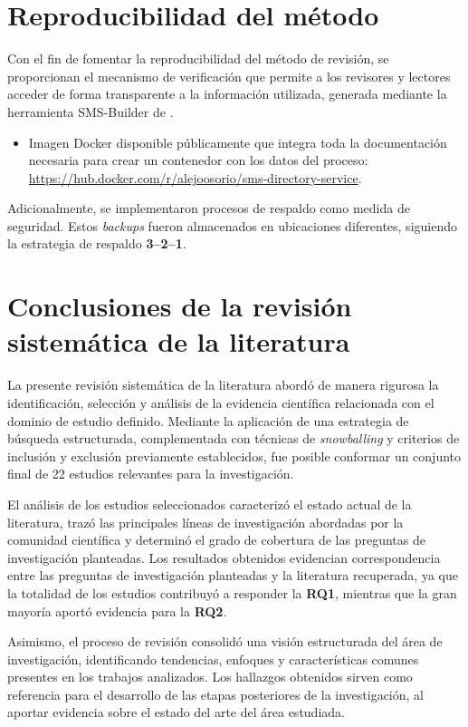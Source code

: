 \section{Reproducibilidad del método}

Con el fin de fomentar la reproducibilidad del método de revisión, se proporcionan el mecanismo de verificación que permite a los revisores y lectores acceder de forma transparente a la información utilizada, generada mediante la herramienta \acs{SMS}-Builder de \citet{SMSBuilder2020}.

\begin{itemize}
	\item Imagen Docker disponible públicamente que integra toda la documentación necesaria para crear un contenedor con los datos del proceso:
	      \url{https://hub.docker.com/r/alejoosorio/sms-directory-service}.
\end{itemize}

\noindent
Adicionalmente, se implementaron procesos de respaldo como medida de seguridad. Estos \textit{backups} fueron almacenados en ubicaciones diferentes, siguiendo la estrategia de respaldo \textbf{3--2--1}.

\section{Conclusiones de la revisión sistemática de la literatura}

La presente revisión sistemática de la literatura abordó de manera rigurosa la identificación, selección y análisis de la evidencia científica relacionada con el dominio de estudio definido. Mediante la aplicación de una estrategia de búsqueda estructurada, complementada con técnicas de \textit{snowballing} y criterios de inclusión y exclusión previamente establecidos, fue posible conformar un conjunto final de 22 estudios relevantes para la investigación.

El análisis de los estudios seleccionados caracterizó el estado actual de la literatura, trazó las principales líneas de investigación abordadas por la comunidad científica y determinó el grado de cobertura de las preguntas de investigación planteadas. Los resultados obtenidos evidencian correspondencia entre las preguntas de investigación planteadas y la literatura recuperada, ya que la totalidad de los estudios contribuyó a responder la \textbf{RQ1}, mientras que la gran mayoría aportó evidencia para la \textbf{RQ2}.

Asimismo, el proceso de revisión consolidó una visión estructurada del área de investigación, identificando tendencias, enfoques y características comunes presentes en los trabajos analizados. Los hallazgos obtenidos sirven como referencia para el desarrollo de las etapas posteriores de la investigación, al aportar evidencia sobre el estado del arte del área estudiada.


